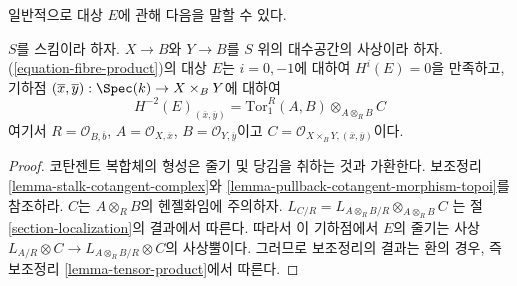 \noindent
일반적으로 대상 $E$에 관해 다음을 말할 수 있다.

\begin{lemma}
\label{lemma-fibre-product}
$S$를 스킴이라 하자. $X \to B$와 $Y \to B$를 $S$ 위의 대수공간의
사상이라 하자. (\ref{equation-fibre-product})의 대상 $E$는
$i = 0, -1$에 대하여 $H^i(E) = 0$을 만족하고, 기하점
$(\overline{x}, \overline{y}) : \Spec(k) \to X \times_B Y$에 대하여
$$
H^{-2}(E)_{(\overline{x}, \overline{y})} =
\text{Tor}_1^R(A, B) \otimes_{A \otimes_R B} C
$$
여기서 $R = \mathcal{O}_{B, \overline{b}}$, $A = \mathcal{O}_{X, \overline{x}}$,
$B = \mathcal{O}_{Y, \overline{y}}$이고
$C = \mathcal{O}_{X \times_B Y, (\overline{x}, \overline{y})}$이다.
\end{lemma}

\begin{proof}
코탄젠트 복합체의 형성은 줄기 및 당김을 취하는 것과 가환한다.
보조정리 \ref{lemma-stalk-cotangent-complex}와
\ref{lemma-pullback-cotangent-morphism-topoi}를 참조하라.
$C$는 $A \otimes_R B$의 헨젤화임에 주의하자.
$L_{C/R} = L_{A \otimes_R B/R} \otimes_{A \otimes_R B} C$
는 절 \ref{section-localization}의 결과에서 따른다.
따라서 이 기하점에서 $E$의 줄기는 사상
$L_{A/R} \otimes C \to L_{A \otimes_R B/R} \otimes C$의 사상뿔이다.
그러므로 보조정리의 결과는 환의 경우, 즉 보조정리
\ref{lemma-tensor-product}에서 따른다.
\end{proof}














